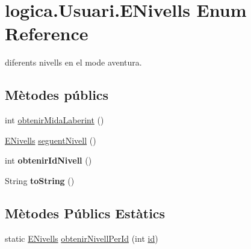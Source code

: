 \hypertarget{enumlogica_1_1_usuari_1_1_e_nivells}{\section{logica.\+Usuari.\+E\+Nivells Enum Reference}
\label{enumlogica_1_1_usuari_1_1_e_nivells}
}


diferents nivells en el mode aventura.  


\subsection*{Mètodes públics}
\begin{DoxyCompactItemize}
\item 
int \hyperlink{enumlogica_1_1_usuari_1_1_e_nivells_a992bd3a4d150a516e56a295a405290df}{obtenir\+Mida\+Laberint} ()
\item 
\hyperlink{enumlogica_1_1_usuari_1_1_e_nivells}{E\+Nivells} \hyperlink{enumlogica_1_1_usuari_1_1_e_nivells_abf9a961b75142c143a6b6a512669c1fa}{seguent\+Nivell} ()
\item 
\hypertarget{enumlogica_1_1_usuari_1_1_e_nivells_aa7984d4c05c0930b048c0b425167622a}{int {\bfseries obtenir\+Id\+Nivell} ()}\label{enumlogica_1_1_usuari_1_1_e_nivells_aa7984d4c05c0930b048c0b425167622a}

\item 
\hypertarget{enumlogica_1_1_usuari_1_1_e_nivells_ad6d60a1c56375cf5b80f2db7f6def227}{String {\bfseries to\+String} ()}\label{enumlogica_1_1_usuari_1_1_e_nivells_ad6d60a1c56375cf5b80f2db7f6def227}

\end{DoxyCompactItemize}
\subsection*{Mètodes Públics Estàtics}
\begin{DoxyCompactItemize}
\item 
static \hyperlink{enumlogica_1_1_usuari_1_1_e_nivells}{E\+Nivells} \hyperlink{enumlogica_1_1_usuari_1_1_e_nivells_a46344a6749a249565ce0cd3a6de823b3}{obtenir\+Nivell\+Per\+Id} (int \hyperlink{classlogica_1_1_usuari_a03e97d4f96974eabebd5b15c95267cdf}{id})
\end{DoxyCompactItemize}
